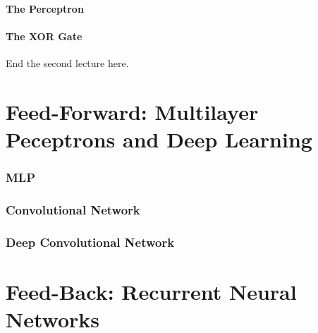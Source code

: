 \documentclass[12pt]{book}
\begin{document}
\subsubsection{The Perceptron}

\subsubsection{The XOR Gate}
End the second lecture here.

\chapter{Feed-Forward: Multilayer Peceptrons and Deep Learning}

\subsection{MLP}

\subsection{Convolutional Network}

\subsection{Deep Convolutional Network}


\chapter{Feed-Back: Recurrent Neural Networks}


 
	
	
\end{document}
